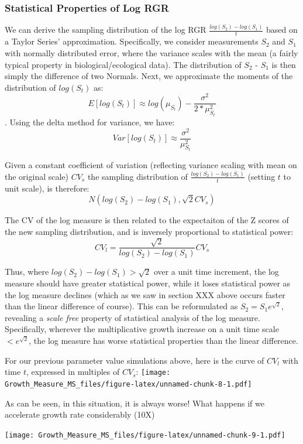 \documentclass[]{article}
\begin{document}
\subsubsection{Statistical Properties of Log
RGR}\label{statistical-properties-of-log-rgr}

We can derive the sampling distribution of the log RGR
\(\frac{log(S_2) - log(S_1)}{t}\) based on a Taylor Series'
approximation. Specifically, we consider measurements \(S_2\) and
\(S_1\) with normally distributed error, where the variance scales with
the mean (a fairly typical property in biological/ecological data). The
distribution of \(S_2\) - \(S_1\) is then simply the difference of two
Normals. Next, we approximate the moments of the distribution of
\(log(S_t)\) as:
\[E[log(S_t)] \approx log(\mu_{S_t}) - \frac{\sigma^2}{2*\mu_{S_t}^2}\].
Using the delta method for variance, we have:
\[Var[log(S_t)] \approx \frac{\sigma^2}{\mu_{S_t}^2}\]

Given a constant coefficient of variation (reflecting variance scaling
with mean on the original scale) \(CV_s\) the sampling distribution of
\(\frac{log(S_2) - log(S_1)}{t}\) (setting \(t\) to unit scale), is
therefore: \[ N(log(S_2) - log(S_1), \sqrt2CV_s)\]

The CV of the log measure is then related to the expectaiton of the Z
scores of the new sampling distribution, and is inversely proportional
to statistical power: \[CV_l =\frac{\sqrt2}{log(S_2) - log(S_1)}CV_s\]

Thus, where \(log(S_2) - log(S_1) > \sqrt2\) over a unit time increment,
the log measure should have greater statistical power, while it loses
statistical power as the log measure declines (which as we saw in
section XXX above occurs faster than the linear difference of course).
This can be reformulated as \(S_2=S_1e^{\sqrt2}\), revealing a
\emph{scale free} property of statistical analysis of the log measure.
Specifically, wherever the multiplicative growth increase on a unit time
scale \(<e^{\sqrt2}\), the log measure has worse statistical properties
than the linear difference.

For our previous parameter value simulations above, here is the curve of
\(CV_l\) with time \(t\), expressed in multiples of \(CV_s\):
\texttt{[image: Growth\_Measure\_MS\_files/figure-latex/unnamed-chunk-8-1.pdf]}

As can be seen, in this situation, it is always worse! What happens if
we accelerate growth rate considerably (10X)

\texttt{[image: Growth\_Measure\_MS\_files/figure-latex/unnamed-chunk-9-1.pdf]}
\end{document}
